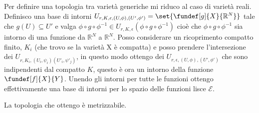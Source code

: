\begin{defn}
Per definire una topologia tra varietà generiche mi riduco al caso di varietà reali.
Definisco una base di intorni $U_{r, K, \epsilon, (U, \phi), (U', \phi')} = \set{\fundef[g]{X}{\mathbb{R}^{N}}}$ tale che $g(U) \subseteq U'$ e valga 
$\phi \circ g \circ \phi^{-1} \in U_{r, K, \epsilon}(\phi \circ g \circ \phi^{-1})$ cioè che $\phi \circ g \circ \phi^{-1}$ sia intorno di una funzione da $\mathbb{R}^{N}$ a $\mathbb{R}^{N}$.
Posso considerare un ricoprimento compatto finito,  ${K_i}$ (che trovo se la varietà X è compatta) e posso prendere l'intersezione dei $U_{r,K_i, (U_i, \psi_i)(U'_i, \psi'_j)}$, in questo modo ottengo
dei $U_{r, \epsilon, (U, \phi), (U', \phi')}$ che sono indipendenti dal compatto $K$, questo è ora un intorno della funzione $\fundef[f]{X}{Y}$. 
Unendo gli intorni per tutte le funzioni ottengo effettivamente una base di intorni per lo spazio delle funzioni lisce $\mathcal{E}$.

\end{defn}

\begin{oss}
 La topologia che ottengo è metrizzabile.
\end{oss}







